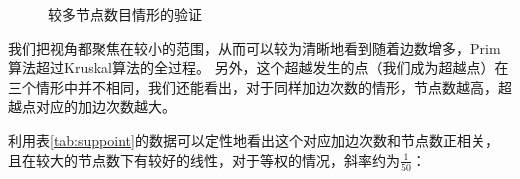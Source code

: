 \documentclass[UTF8]{ctexart}
\begin{document}
\begin{figure}[htbp]
    \caption{较多节点数目情形的验证}
    \label{fig:5000&10000a}
\end{figure}

我们把视角都聚焦在较小的范围，从而可以较为清晰地看到随着边数增多，Prim算法超过Kruskal算法的全过程。 另外，这个超越发生的点（我们成为超越点）在三个情形中并不相同，我们还能看出，对于同样加边次数的情形，节点数越高，超越点对应的加边次数越大。 

利用表\ref{tab:suppoint}的数据可以定性地看出这个对应加边次数和节点数正相关，且在较大的节点数下有较好的线性，对于等权的情况，斜率约为\(\frac{1}{50}\)：
\end{document}
